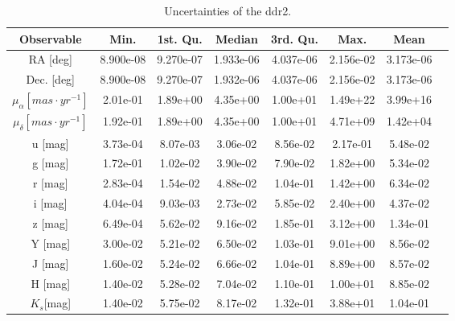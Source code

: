 \begin{table}[ht!]
\caption{Uncertainties of the \gls{ddr2}.}
\begin{center}
\begin{tabular}{|c|c|c|c|c|c|c|c|}
\hline
Observable & Min. & 1st. Qu. & Median & 3rd. Qu. & Max. &Mean\\
\hline
\hline
RA [deg]&8.900e-08 &9.270e-07&1.933e-06&4.037e-06&2.156e-02&3.173e-06\\
Dec. [deg] &8.900e-08&9.270e-07&1.932e-06&4.037e-06&2.156e-02&3.173e-06\\
$\mu_{\alpha} [mas\cdot yr^{-1}]$&2.01e-01 &1.89e+00& 4.35e+00& 1.00e+01& 1.49e+22&3.99e+16\\ 
$\mu_{\delta} [mas\cdot yr^{-1}]$&1.92e-01 &1.89e+00 &4.35e+00 &1.00e+01 & 4.71e+09&1.42e+04\\
u [mag] &3.73e-04& 8.07e-03& 3.06e-02& 8.56e-02& 2.17e-01&5.48e-02\\
g [mag] &1.72e-01 & 1.02e-02&  3.90e-02 & 7.90e-02 & 1.82e+00&5.34e-02\\
r [mag] & 2.83e-04 & 1.54e-02& 4.88e-02 &1.04e-01& 1.42e+00&6.34e-02\\
i [mag] & 4.04e-04 & 9.03e-03&  2.73e-02& 5.85e-02& 2.40e+00&4.37e-02\\
z [mag] & 6.49e-04& 5.62e-02& 9.16e-02& 1.85e-01& 3.12e+00&1.34e-01\\
Y [mag] & 3.00e-02& 5.21e-02& 6.50e-02& 1.03e-01& 9.01e+00&8.56e-02\\
J [mag] & 1.60e-02& 5.24e-02& 6.66e-02& 1.04e-01& 8.89e+00&8.57e-02\\
H [mag] & 1.40e-02& 5.28e-02& 7.04e-02& 1.10e-01& 1.00e+01&8.85e-02\\
$K_s$[mag]&1.40e-02& 5.75e-02& 8.17e-02& 1.32e-01& 3.88e+01&1.04e-01\\
\hline
\end{tabular}
\end{center}
\label{tab:DR2uncertainties}
\end{table}%

